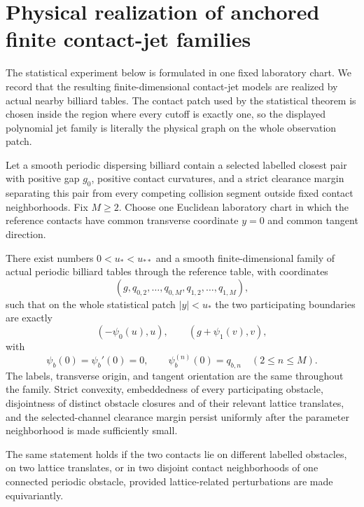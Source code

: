 \section{Physical realization of anchored finite contact-jet families}
\label{sec:v22-anchored-realization}

The statistical experiment below is formulated in one fixed laboratory chart.
We record that the resulting finite-dimensional contact-jet models are
realized by actual nearby billiard tables.  The contact patch used by the
statistical theorem is chosen inside the region where every cutoff is exactly
one, so the displayed polynomial jet family is literally the physical graph
on the whole observation patch.

\begin{proposition}
\label{prop:v22-anchored-realization}
Let a smooth periodic dispersing billiard contain a selected labelled closest
pair with positive gap $g_0$, positive contact curvatures, and a strict
clearance margin separating this pair from every competing collision segment
outside fixed contact neighborhoods.  Fix $M\ge2$.  Choose one Euclidean
laboratory chart in which the reference contacts have common transverse
coordinate $y=0$ and common tangent direction.

There exist numbers $0<u_*<u_{**}$ and a smooth finite-dimensional family of
actual periodic billiard tables through the reference table, with coordinates
\[
 (g,q_{0,2},\ldots,q_{0,M},q_{1,2},\ldots,q_{1,M}),
\]
such that on the whole statistical patch $|y|<u_*$ the two participating
boundaries are exactly
\begin{equation}\label{eq:v22-realized-anchored-graphs}
 (-\psi_0(u),u),\qquad (g+\psi_1(v),v),
\end{equation}
with
\[
 \psi_b(0)=\psi_b'(0)=0,
 \qquad \psi_b^{(n)}(0)=q_{b,n}\quad(2\le n\le M).
\]
The labels, transverse origin, and tangent orientation are the same throughout
the family.  Strict convexity, embeddedness of every participating obstacle,
disjointness of distinct obstacle closures and of their relevant lattice
translates, and the selected-channel clearance margin persist uniformly after
the parameter neighborhood is made sufficiently small.

The same statement holds if the two contacts lie on different labelled
obstacles, on two lattice translates, or in two disjoint contact
neighborhoods of one connected periodic obstacle, provided lattice-related
perturbations are made equivariantly.
\end{proposition}

